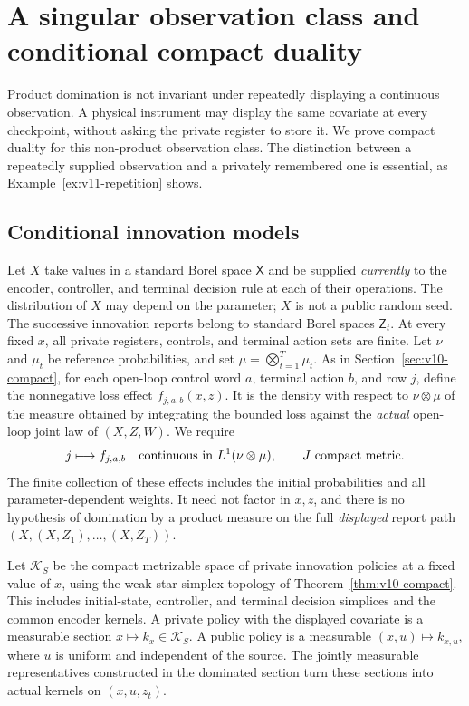 \section{A singular observation class and conditional compact duality}
\label{sec:v11-conditional}

Product domination is not invariant under repeatedly displaying a
continuous observation. A physical instrument may display the same
covariate at every checkpoint, without asking the private register to
store it. We prove compact duality for this non-product observation class.
The distinction between a repeatedly supplied observation and a privately
remembered one is essential, as Example~\ref{ex:v11-repetition} shows.

\subsection{Conditional innovation models}
Let $X$ take values in a standard Borel space $\mathsf X$ and be supplied
\emph{currently} to the encoder, controller, and terminal decision rule at
each of their operations. The distribution of $X$ may depend on the
parameter; $X$ is not a public random seed. The successive innovation
reports belong to standard Borel spaces $\mathsf Z_t$. At every fixed
$x$, all private registers, controls, and terminal action sets are finite.
Let $\nu$ and $\mu_t$ be reference probabilities, and set
$\mu=\bigotimes_{t=1}^T\mu_t$. As in Section~\ref{sec:v10-compact}, for
each open-loop control word $a$, terminal action $b$, and row $j$, define
the nonnegative loss effect $f_{j,a,b}(x,z)$. It is the density with respect
to $\nu\otimes\mu$ of the measure obtained by integrating the bounded
loss against the \emph{actual} open-loop joint law of $(X,Z,W)$.
We require
\begin{equation}
 j\longmapsto f_{j,a,b}\quad\hbox{continuous in }
 L^1(\nu\otimes\mu),\qquad J\hbox{ compact metric}.
 \label{eq:v11-effects}
\end{equation}
The finite collection of these effects includes the initial probabilities
and all parameter-dependent weights. It need not factor in $x,z$, and
there is no hypothesis of domination by a product measure on the full
\emph{displayed} report path $(X,(X,Z_1),\ldots,(X,Z_T))$.

Let $\mathcal K_S$ be the compact metrizable space of private innovation
policies at a fixed value of $x$, using the weak star simplex topology of
Theorem~\ref{thm:v10-compact}. This includes initial-state, controller, and
terminal decision simplices and the common encoder kernels. A private
policy with the displayed covariate is a measurable section
$x\mapsto k_x\in\mathcal K_S$. A public policy is a measurable
$(x,u)\mapsto k_{x,u}$, where $u$ is uniform and independent of the source.
The jointly measurable representatives constructed in the dominated
section turn these sections into actual kernels on $(x,u,z_t)$.

